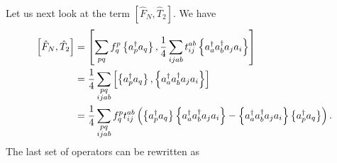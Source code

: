 Let us next look at the term $\left[ \hat{F}_N, \hat{T}_2 \right]$. We have
    \begin{align*}
        \left[ \hat{F}_N, \hat{T}_2 \right] 
        &= \left[\sum_{pq} f_q^p \left\{a^\dagger_p a_q\right\},
            \frac{1}{4}\sum_{ijab} t_{ij}^{ab} \left\{a^\dagger_a a^\dagger_b a_j a_i\right\} \right] \\
        &= \frac{1}{4}\sum_{\substack{pq\\ijab}}
        \left[ \left\{a^\dagger_p a_q\right\}, \left\{a^\dagger_a a^\dagger_b a_j a_i\right\} \right] \\
        &= \frac{1}{4}\sum_{\substack{pq\\ijab}}
            f_q^p t_{ij}^{ab}
        \left( \left\{a^\dagger_p a_q\right\} \left\{a^\dagger_a a^\dagger_b a_j a_i\right\}
            - \left\{a^\dagger_a a^\dagger_b a_j a_i\right\} \left\{a^\dagger_p a_q\right\} \right).
    \end{align*}
The last set of operators can be rewritten as 
